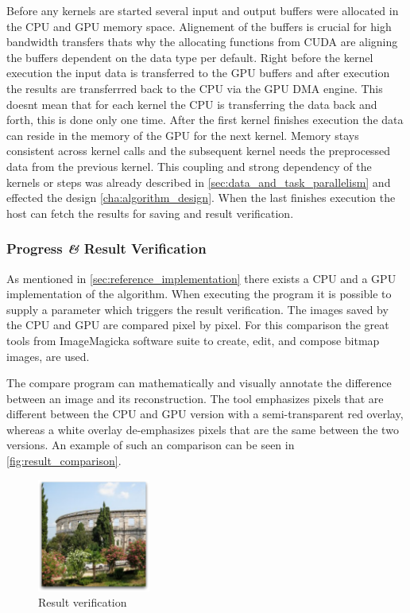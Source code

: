 Before any kernels are started several input and output buffers were allocated
in the \gls{CPU} and \gls{GPU} memory space. Alignement of the buffers is
crucial for high bandwidth transfers thats why the allocating functions from
\gls{CUDA} are aligning the buffers dependent on the data type per default.
Right before the kernel execution the input data is transferred to the \gls{GPU}
buffers and after execution the results are transferrred back to the \gls{CPU}
via the \gls{GPU} \gls{DMA} engine. This doesnt mean that for each kernel the
\gls{CPU} is transferring the data back and forth, this is done only one time.
After the first kernel finishes execution the data can reside in the memory of
the \gls{GPU} for the next kernel. Memory stays consistent across kernel calls
and the subsequent kernel needs the preprocessed data from the previous kernel.
This coupling and strong dependency of the kernels or steps was already
described in \autoref{sec:data_and_task_parallelism} and effected the design
\autoref{cha:algorithm_design}. When the last finishes execution the
host can fetch the results for saving and result verification. 

\subsubsection{Progress \textit{\&} Result Verification} %
\label{ssub:progress_result_verification}
As mentioned in \autoref{sec:reference_implementation} there exists a \gls{CPU}
and a \gls{GPU} implementation of the algorithm. When executing the program
it is possible to supply a parameter which triggers the result verification. The
images saved by the \gls{CPU} and \gls{GPU} are compared pixel by pixel. For 
this comparison the great tools from ImageMagick\TReg a software suite to 
create, edit, and compose bitmap images, are used. 

The compare program can mathematically and visually annotate the difference 
between an image and its reconstruction. The tool emphasizes pixels that are 
different between the \gls{CPU} and \gls{GPU} version with a semi-transparent red
overlay, whereas a white overlay de-emphasizes pixels that are the same between
the two versions. An example of such an comparison can be seen in 
\autoref{fig:result_comparison}.

\begin{figure}[ht]
  \centering
 	\includegraphics[width=0.33\textwidth]{gfx/source}
  \caption{Result verification}
  \label{fig:result_comparison}
\end{figure}

